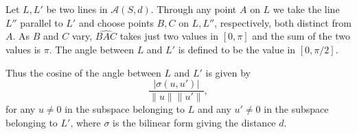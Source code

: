 Let $L, L'$ be two lines in $\mathcal{A}(S, d)$. Through any point $A$ on $L$ we take the line $L''$ parallel to $L'$ and choose points $B, C$ on $L, L''$, respectively, both distinct from $A$. As $B$ and $C$ vary, $\widehat{BAC}$ takes just two values in $[0, \pi]$ and the sum of the two values is $\pi$. The angle between $L$ and $L'$ is defined to be the value in $[0, \pi/2]$.

Thus the cosine of the angle between $L$ and $L'$ is given by
$$\frac{|\sigma(u, u')|}{\|u\| \|u'\|},$$
for any $u \neq 0$ in the subspace belonging to $L$ and any $u' \neq 0$ in the subspace belonging to $L'$, where $\sigma$ is the bilinear form giving the distance $d$.
